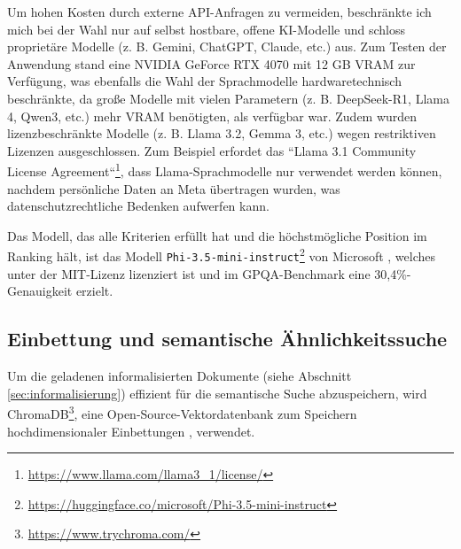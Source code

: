 \documentclass[12pt,letterpaper]{article} %
\begin{document}
Um hohen Kosten durch externe API-Anfragen zu vermeiden, beschränkte ich mich bei der Wahl nur auf selbst hostbare, offene KI-Modelle und schloss proprietäre Modelle (z. B. Gemini, ChatGPT, Claude, etc.) aus.
Zum Testen der Anwendung stand eine NVIDIA GeForce RTX 4070 mit 12 GB VRAM zur Verfügung, was ebenfalls die Wahl der Sprachmodelle hardwaretechnisch beschränkte, da große Modelle mit vielen Parametern (z. B. DeepSeek-R1, Llama 4, Qwen3, etc.) mehr VRAM benötigten, als verfügbar war.
Zudem wurden lizenzbeschränkte Modelle (z. B. Llama 3.2, Gemma 3, etc.) wegen restriktiven Lizenzen ausgeschlossen.
Zum Beispiel erfordet das ``Llama 3.1 Community License Agreement``\footnote{\url{https://www.llama.com/llama3_1/license/}}, dass Llama-Sprachmodelle nur verwendet werden können, nachdem persönliche Daten an Meta übertragen wurden, was datenschutzrechtliche Bedenken aufwerfen kann.

Das Modell, das alle Kriterien erfüllt hat und die höchstmögliche Position im Ranking hält, ist das Modell \texttt{Phi-3.5-mini-instruct}\footnote{\url{https://huggingface.co/microsoft/Phi-3.5-mini-instruct}} von Microsoft \citep{abdin_phi-3_2024}, welches unter der MIT-Lizenz lizenziert ist und im GPQA-Benchmark eine 30,4\%-Genauigkeit erzielt.

\subsection{Einbettung und semantische Ähnlichkeitssuche}
\label{sec:einbettung_semantische_suche}
Um die geladenen informalisierten Dokumente (siehe Abschnitt \ref{sec:informalisierung}) effizient für die semantische Suche abzuspeichern, wird ChromaDB\footnote{\url{https://www.trychroma.com/}}, eine Open-Source-Vektordatenbank zum Speichern hochdimensionaler Einbettungen \citep[S. 2]{sheng_lprotector_2024}, verwendet.
\end{document}
